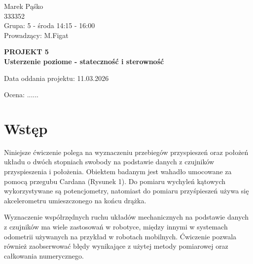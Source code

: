 \documentclass[a4paper,12pt]{article}
\begin{document}
\begin{titlepage}
\vspace{2cm}

\begin{flushright}
    \Large Marek Pąśko\\
    \Large 333352\\
    \Large Grupa: 5 - środa 14:15 - 16:00\\
    \Large Prowadzący: M.Figat\\
\end{flushright}

\vfill

\begin{center}
    \fontsize{50}{10}\selectfont
    \textbf{PROJEKT 5}\\[0.5cm]
    \textbf{Usterzenie poziome - stateczność i sterowność}\\[0.5cm]
\end{center}

\vfill

\begin{flushleft}
    \Large Data oddania projektu: 11.03.2026
\end{flushleft}

\begin{flushright}
   \LARGE Ocena: ......
\end{flushright}



\end{titlepage}
\newpage


\section{Wstęp}
Niniejsze ćwiczenie polega na wyznaczeniu przebiegów przyspieszeń oraz położeń układu o dwóch stopniach swobody na podstawie danych z czujników przyspieszenia i położenia. Obiektem badanym jest wahadło umocowane za pomocą przegubu Cardana (Rysunek 1). Do pomiaru wychyleń kątowych wykorzystywane są potencjometry, natomiast do pomiaru przyśpieszeń używa się akcelerometru umieszczonego na końcu drążka.

Wyznaczenie współrzędnych ruchu układów mechanicznych na podstawie danych z czujników ma wiele zastosowań w robotyce, między innymi w systemach odometrii używanych na przykład w robotach mobilnych. Ćwiczenie pozwala również zaobserwować błędy wynikające z użytej metody pomiarowej oraz całkowania numerycznego.
\end{document}
